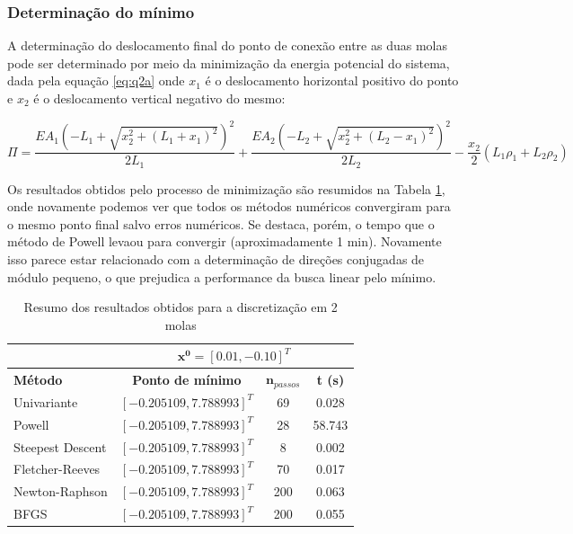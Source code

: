 \documentclass[10pt, a4paper]{article}
\begin{document}
\subsubsection{Determinação do mínimo}

A determinação do deslocamento final do ponto de conexão entre as duas molas pode ser determinado por meio da minimização da energia potencial do sistema,
dada pela equação \ref{eq:q2a} onde $x_1$ é o deslocamento horizontal positivo do ponto e $x_2$ é o deslocamento vertical negativo do mesmo:

\begin{equation}\label{eq:q2a}
  \Pi = \frac{EA_{1} \left(- L_{1} + \sqrt{x_{2}^{2} + \left(L_{1} + x_{1}\right)^{2}}\right)^{2}}{2L_{1}} + \frac{EA_{2} \left(- L_{2} + \sqrt{x_{2}^{2} + \left(L_{2} - x_{1}\right)^{2}}\right)^{2}}{2L_{2}} - \frac{x_{2}}{2} \left(L_{1} \rho_{1} + L_{2} \rho_{2}\right)
\end{equation}

Os resultados obtidos pelo processo de minimização são resumidos na Tabela \ref{tab:q2a_results}, onde novamente podemos ver que todos os métodos numéricos
convergiram para o mesmo ponto final salvo erros numéricos. Se destaca, porém, o tempo que o método de Powell levaou para convergir (aproximadamente 1 min).
Novamente isso parece estar relacionado com a determinação de direções conjugadas de módulo pequeno, o que prejudica a performance da busca linear pelo mínimo.

\begin{table}[htpb]
  \centering
  \begin{tabular}{|l|c|c|c|}
    \multicolumn{1}{c}{} %
    & 
    \multicolumn{3}{c}{$\mathbf{x^0} = [0.01, -0.10]^T$} \\%
    \hline%
    \textbf{Método}
    &
    \textbf{Ponto de mínimo}
    & 
    $\mathbf{n}_{passos}$
    & 
    \textbf{t (s)}
    \\
    Univariante        & $[-0.205109, 7.788993]^T$ & 69  &  0.028    \\
    Powell             & $[-0.205109, 7.788993]^T$ & 28  & 58.743    \\
    Steepest Descent   & $[-0.205109, 7.788993]^T$ & 8   &  0.002    \\
    Fletcher-Reeves    & $[-0.205109, 7.788993]^T$ & 70  &  0.017    \\
    Newton-Raphson     & $[-0.205109, 7.788993]^T$ & 200 &  0.063    \\
    BFGS               & $[-0.205109, 7.788993]^T$ & 200 &  0.055    \\
    \hline
  \end{tabular}
  \caption{Resumo dos resultados obtidos para a discretização em 2 molas}
  \label{tab:q2a_results}
\end{table}
\end{document}
